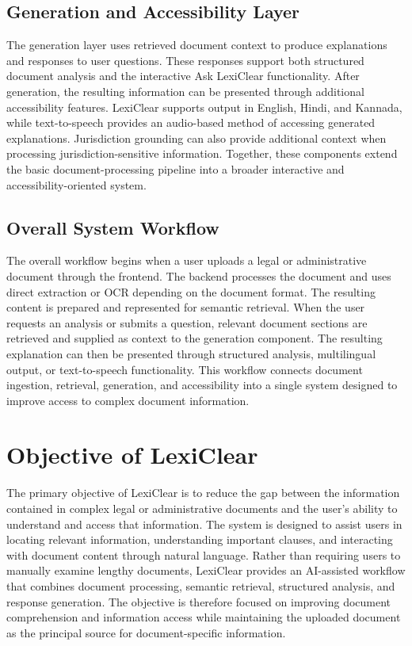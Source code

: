 \documentclass[12pt,a4paper,oneside]{report}
\begin{document}
\subsection{Generation and Accessibility Layer}

The generation layer uses retrieved document context to produce explanations
and responses to user questions. These responses support both structured
document analysis and the interactive Ask LexiClear functionality. After
generation, the resulting information can be presented through additional
accessibility features. LexiClear supports output in English, Hindi, and
Kannada, while text-to-speech provides an audio-based method of accessing
generated explanations. Jurisdiction grounding can also provide additional
context when processing jurisdiction-sensitive information. Together, these
components extend the basic document-processing pipeline into a broader
interactive and accessibility-oriented system.

\subsection{Overall System Workflow}

The overall workflow begins when a user uploads a legal or administrative
document through the frontend. The backend processes the document and uses
direct extraction or OCR depending on the document format. The resulting
content is prepared and represented for semantic retrieval. When the user
requests an analysis or submits a question, relevant document sections are
retrieved and supplied as context to the generation component. The resulting
explanation can then be presented through structured analysis, multilingual
output, or text-to-speech functionality. This workflow connects document
ingestion, retrieval, generation, and accessibility into a single system
designed to improve access to complex document information.

\section{Objective of LexiClear}

The primary objective of LexiClear is to reduce the gap between the
information contained in complex legal or administrative documents and the
user's ability to understand and access that information. The system is
designed to assist users in locating relevant information, understanding
important clauses, and interacting with document content through natural
language. Rather than requiring users to manually examine lengthy documents,
LexiClear provides an AI-assisted workflow that combines document
processing, semantic retrieval, structured analysis, and response
generation. The objective is therefore focused on improving document
comprehension and information access while maintaining the uploaded document
as the principal source for document-specific information.
\end{document}
